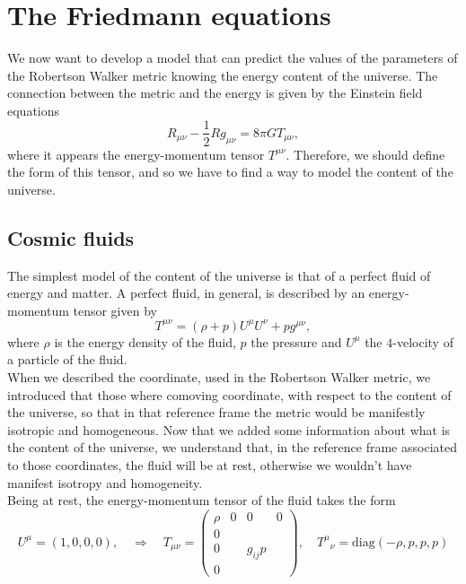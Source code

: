 \section{The Friedmann equations}
We now want to develop a model that can predict the values of the parameters of the Robertson Walker metric knowing the energy content of the universe. The connection between the metric and the energy is given by the Einstein field equations
\begin{equation}\label{EFE}
    R_{\mu\nu}-\frac{1}{2}Rg_{\mu\nu}=8\pi GT_{\mu\nu},
\end{equation}
where it appears the energy-momentum tensor $T^{\mu\nu}$. Therefore, we should define the form of this tensor, and so we have to find a way to model the content of the universe.
\subsection{Cosmic fluids}
The simplest model of the content of the universe is that of a perfect fluid of energy and matter. A perfect fluid, in general, is described by an energy-momentum tensor given by
\begin{equation}
    T^{\mu\nu}=(\rho+p)U^\mu U^\nu+pg^{\mu\nu},
\end{equation}
where $\rho$ is the energy density of the fluid, $p$ the pressure and $U^\mu$ the $4$-velocity of a particle of the fluid.\\When we described the coordinate, used in the Robertson Walker metric, we introduced that those where comoving coordinate, with respect to the content of the universe, so that in that reference frame the metric would be manifestly isotropic and homogeneous. Now that we added some information about what is the content of the universe, we understand that, in the reference frame associated to those coordinates, the fluid will be at rest, otherwise we wouldn't have manifest isotropy and homogeneity.\\Being at rest, the energy-momentum tensor of the fluid takes the form
\begin{equation}
    U^\mu=(1,0,0,0),\quad\Rightarrow\quad
    T_{\mu\nu}=\begin{pmatrix}
        \rho&0&0&0\\
        0&&&\\
        0&&g_{ij}p&\\
        0&&&
    \end{pmatrix},
    \quad T^\mu\phantom{} _\nu=\text{diag}(-\rho,p,p,p)\label{EMTensorCosmicFluid}
\end{equation}
